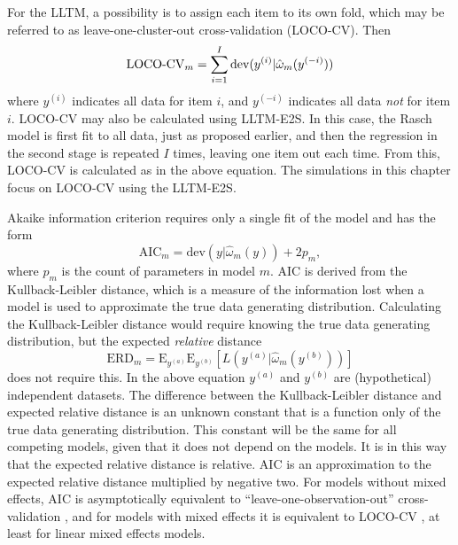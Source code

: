 For the LLTM, a possibility is to assign each item to its own fold, which may be referred to as leave-one-cluster-out cross-validation (LOCO-CV). Then
\begin{equation}
	\mathrm{LOCO\textnormal{-}CV}_m = \sum_{i=1}^{I} \mathrm{dev}(y^{(i)} | \hat \omega_m( y^{(-i)}))
\end{equation}
where $y^{(i)}$ indicates all data for item $i$, and $y^{(-i)}$ indicates all data \emph{not} for item $i$. LOCO-CV may also be calculated using LLTM-E2S. In this case, the Rasch model is first fit to all data, just as proposed earlier, and then the regression in the second stage is repeated $I$ times, leaving one item out each time. From this, LOCO-CV is calculated as in the above equation. The simulations in this chapter focus on LOCO-CV using the LLTM-E2S.


Akaike information criterion \parencite[AIC;][]{akaike1974new} requires only a single fit of the model and has the form
\begin{equation} \label{eq:aic}
	\mathrm{AIC}_m = \mathrm{dev}(y | \hat \omega_m(y)) + 2p_m
,\end{equation}
where $p_m$ is the count of parameters in model $m$. 
AIC is derived from the Kullback-Leibler distance, which is a measure of the information lost when a model is used to approximate the true data generating distribution. Calculating the Kullback-Leibler distance would require knowing the true data generating distribution, but the expected \emph{relative} distance
\begin{equation}
	\mathrm{ERD}_m = \mathrm{E}_{y^{(a)}} \mathrm{E}_{y^{(b)}} [L(y^{(a)} |\hat \omega_m(y^{(b)}))]
\end{equation}
does not require this.
In the above equation $y^{(a)}$ and $y^{(b)}$ are (hypothetical) independent datasets. The difference between the Kullback-Leibler distance and expected relative distance is an unknown constant that is a function only of the true data generating distribution. This constant will be the same for all competing models, given that it does not depend on the models. 
It is in this way that the expected relative distance is relative.
AIC is an approximation to the expected relative distance multiplied by negative two. For models without mixed effects, AIC is asymptotically equivalent to  ``leave-one-observation-out'' cross-validation \parencite{stone1977asymptotic}, and for models with mixed effects it is equivalent to LOCO-CV \parencite{fang2011asymptotic}, at least for linear mixed effects models.

